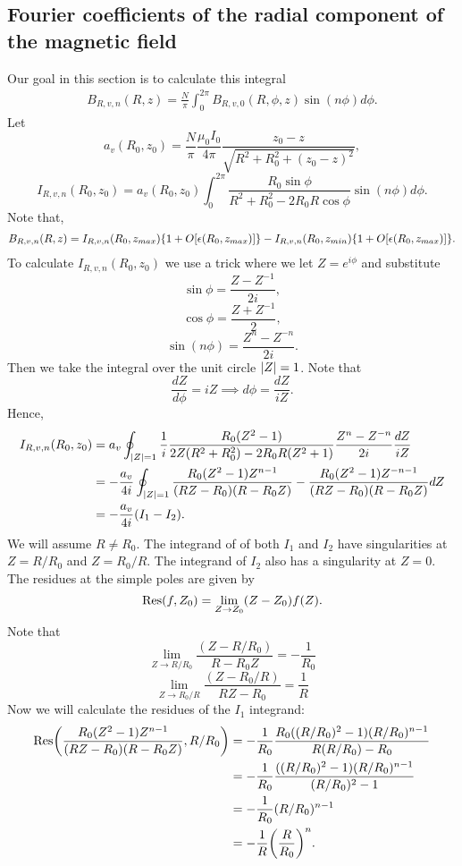 \documentclass{article}
\begin{document}
\subsection{Fourier coefficients of the radial component of the magnetic field}

Our goal in this section is to calculate this integral
\[\begin{aligned}
B_{R, v, n}(R, z)= \frac{N}{\pi}\int_0^{2\pi} B_{R, v, 0}(R, \phi, z)\sin(n\phi)d\phi.
\end{aligned}\]
Let
\[a_v(R_0, z_0)=\frac{N}{\pi}\frac{\mu_0 I_0}{4\pi}\frac{z_0-z}{\sqrt{R^2+R_0^2+(z_0-z)^2}},\]
\[I_{R,v,n}(R_0, z_0) = a_v(R_0, z_0)\int_0^{2\pi}\frac{R_0\sin\phi}{R^2+R_0^2-2R_0R\cos\phi}\sin(n\phi) d\phi.\]
Note that,
\[\begin{aligned}
B_{R, v, n}(R, z)= I_{R,v,n}(R_0, z_{max})\qty{1+O[\epsilon(R_0, z_{max})]} - I_{R,v,n}(R_0, z_{min})\qty{1+O[\epsilon(R_0, z_{max})]}.
\end{aligned}\]
To calculate $I_{R,v,n}(R_0, z_0)$  we use a trick where we let $Z=e^{i\phi}$ and substitute
\[\sin\phi = \frac{Z-Z^{-1}}{2i},\]
\[\cos\phi = \frac{Z+Z^{-1}}{2},\]
\[\sin(n\phi) = \frac{Z^n-Z^{-n}}{2i}.\]
Then we take the integral over the unit circle $\abs{Z}=1$.
Note that
\[\frac{dZ}{d\phi} = iZ \implies d\phi = \frac{dZ}{iZ}.\]
Hence,
\[\begin{aligned}
I_{R,v,n}(R_0, z_0) &= a_v\oint_{|Z|=1}\frac{1}{i}\frac{R_0(Z^2-1)}{2Z(R^2+R_0^2)-2R_0R(Z^2+1)}\frac{Z^n-Z^{-n}}{2i} \frac{dZ}{iZ} \\
&= -\frac{a_v}{4i}\oint_{|Z|=1}\frac{R_0(Z^2-1)Z^{n-1}}{(RZ-R_0)(R-R_0Z)} - \frac{R_0(Z^2-1)Z^{-n-1}}{(RZ-R_0)(R-R_0Z)} dZ \\
&= -\frac{a_v}{4i}\qty(I_1 - I_2).
\end{aligned}\]
We will assume $R\ne R_0$. The integrand of of both $I_1$ and $I_2$ have singularities at $Z=R/R_0$ and $Z=R_0/R$.
The integrand of $I_2$ also has a singularity at $Z=0$.
The residues at the simple poles are given by
\[\text{Res}\qty(f, Z_0) = \lim_{Z\to Z_0} (Z-Z_0)f(Z).\]
Note that
\[\lim_{Z\to R/R_0}\frac{(Z-R/R_0)}{R-R_0Z} = -\frac{1}{R_0}\]
\[\lim_{Z\to R_0/R}\frac{(Z-R_0/R)}{RZ-R_0} = \frac{1}{R}\]
Now we will calculate the residues of the $I_1$ integrand:
\[\begin{aligned}
\text{Res}\qty(\frac{R_0(Z^2-1)Z^{n-1}}{(RZ-R_0)(R-R_0Z)}, R/R_0) &= -\frac{1}{R_0}\frac{R_0((R/R_0)^2-1)(R/R_0)^{n-1}}{R(R/R_0)-R_0} \\
&= -\frac{1}{R_0}\frac{((R/R_0)^2-1)(R/R_0)^{n-1}}{(R/R_0)^2-1} \\
&= -\frac{1}{R_0}(R/R_0)^{n-1} \\
&= -\frac{1}{R} \qty(\frac{R}{R_0})^{n}.
\end{aligned}\]
\end{document}
